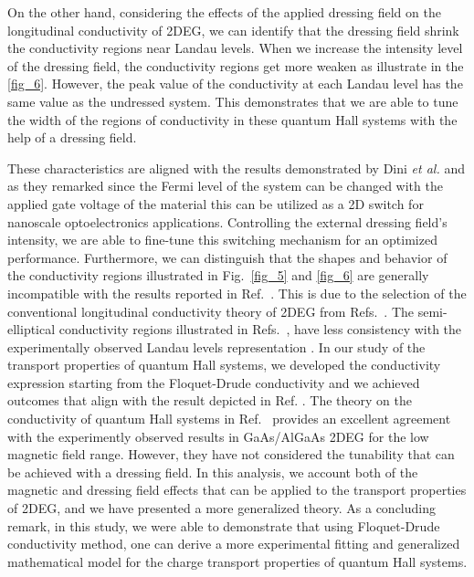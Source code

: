 On the other hand, considering the effects of the applied dressing field on the longitudinal conductivity of 2DEG, we can identify that the dressing field shrink the conductivity regions near Landau levels.
When we increase the intensity level of the dressing field, the conductivity regions get more weaken as illustrate in the \ref{fig_6}.
However, the peak value of the conductivity at each Landau level has the same value as the undressed system. This demonstrates that we are able to tune the width of the regions of conductivity in these quantum Hall systems with the help of a dressing field.

These characteristics are aligned with the results demonstrated by Dini \textit{et al.} \cite{dini16} and as they remarked since the Fermi level of the system can be changed with the applied gate voltage of the material this can be utilized as a 2D switch for nanoscale optoelectronics applications. Controlling  the external dressing field's intensity, we are able to fine-tune this switching mechanism for an optimized performance.
Furthermore, we can distinguish that the shapes and behavior of the conductivity regions illustrated in Fig.~\ref{fig_5} and \ref{fig_6} are generally incompatible with the results reported in Ref.~\cite{dini16}. This is due to the selection of the conventional longitudinal conductivity theory of 2DEG from Refs.~\cite{ando74_1,ando82}. The semi-elliptical conductivity regions illustrated in Refs.~\cite{dini16,ando74_1,ando82}, have less consistency with the experimentally observed Landau levels representation \cite{endo09}.
In our study of the transport properties of quantum Hall systems, we developed the conductivity expression starting from the Floquet-Drude conductivity \cite{wackerl20} and we achieved outcomes that align with the result depicted in Ref. \cite{endo09}.
The theory on the conductivity of quantum Hall systems in Ref.~\cite{endo09} provides an excellent agreement with the experimently observed results in GaAs/AlGaAs 2DEG for the low magnetic field range.
However, they have not considered the tunability that can be achieved with a dressing field. In this analysis, we account both of the magnetic and dressing field effects that can be applied to the transport properties of 2DEG, and we have presented a more generalized theory. As a concluding remark, in this study, we were able to demonstrate that using Floquet-Drude conductivity method, one can derive a more experimental fitting and generalized mathematical model for the charge transport properties of quantum Hall systems.
